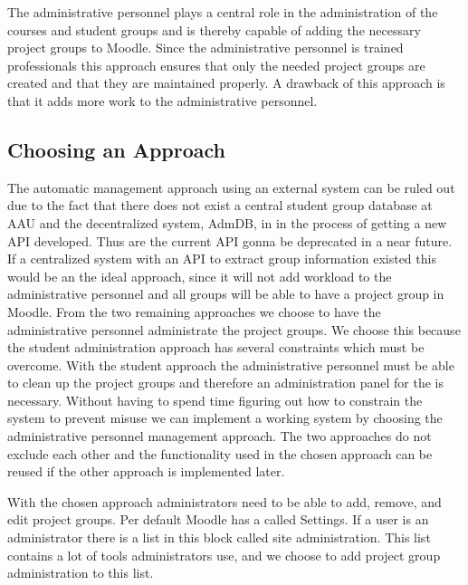 The administrative personnel plays a central role in the administration of the courses and student groups and is thereby capable of adding the necessary project groups to Moodle. 
Since the administrative personnel is trained professionals this approach ensures that only the needed project groups are created and that they are maintained properly. 
A drawback of this approach is that it adds more work to the administrative personnel.


\subsection{Choosing an Approach}
The automatic management approach using an external system can be ruled out due to the fact that there does not exist a central student group database at AAU and the decentralized system, AdmDB, in in the process of getting a new API developed.
Thus are the current API gonna be deprecated in a near future. 
If a centralized system with an API to extract group information existed this would be an the ideal approach, since it will not add workload to the administrative personnel and all groups will be able to have a project group in Moodle. 
From the two remaining approaches we choose to have the administrative personnel administrate the project groups. 
We choose this because the student administration approach has several constraints which must be overcome. 
With the student approach the administrative personnel must be able to clean up the project groups and therefore an administration panel for the \admpers{} is necessary.
Without having to spend time figuring out how to constrain the system to prevent misuse we can implement a working system by choosing the administrative personnel management approach.
The two approaches do not exclude each other and the functionality used in the chosen approach can be reused if the other approach is implemented later.

With the chosen approach administrators need to be able to add, remove, and edit project groups.
Per default Moodle has a \block{} called Settings. 
If a user is an administrator there is a list in this block called site administration. 
This list contains a lot of tools administrators use, and we choose to add project group administration to this list. 

